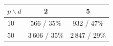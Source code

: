 \begin{tabular}{lcc}
\toprule
$p\backslash d$ & 2 & 5 \\
\midrule
10 & 566 / 35\% & 932 / 47\% \\
50 & 3\,606 / 35\% & 2\,847 / 29\% \\
\bottomrule
\end{tabular}